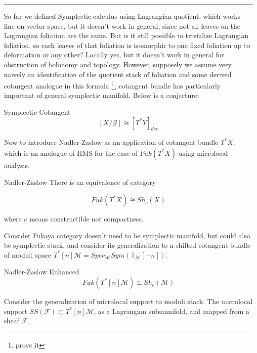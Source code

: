 \documentclass{article}
\begin{document}
\vspace{0.5cm}
\noindent\rule{\textwidth}{0.4pt}
\vspace{0.5cm}



\noindent
So far we defined Symplectic calculus using Lagrangian quotient, which works fine on vector space,
but it doesn't work in general, since not all leaves on the Lagrangian foliation are the same.
But is it still possible to trivialize Lagrangian foliation, 
so each leaves of that foliation is isomorphic to one fixed foliation up to deformation or any other?
Locally yes, but it doesn't work in general for obstruction of holonomy and topology.
However, supposely we assume very na\"{\i}vely 
an identification of the quotient stack of foliation and some derived cotangent analogue in this formula \footnote{prove it},
cotangent bundle has particularly important of general symplectic manifold. Below is a conjecture: \\

\begin{conjecture}{Symplectic Cotangent}{}
\[
[X/\mathcal{G}] \cong [T^* Y]_{der}
\]
\end{conjecture}


\noindent
Now to introduce Nadler-Zaslow as an application of cotangent bundle $T^*X$,
which is an analogue of HMS for the case of $Fuk(T^*X)$ using microlocal analysis. \\

\begin{proposition}{Nadler-Zaslow}{}
There is an equivalence of category

\[Fuk(T^*X) \cong Sh_c(X)\]

where $c$ means constructible not compactness.
\end{proposition}

\noindent
Consider Fukaya category doesn't need to be symplectic manifold, but could also be symplectic stack,
and consider its generalization to n-shifted cotangent bundle of moduli space 
$T^*[n]\mathcal{M} = Spec_{\mathcal{M}} Sym(\mathbb{T}_{\mathcal{M}}[-n])$. \\

\begin{conjecture}{Nadler-Zaslow Enhanced}{}
\[Fuk(T^*[n]\mathcal{M}) \cong Sh_c(\mathcal{M})\]
\end{conjecture}


\begin{remark}{}{}
Consider the generalization of microlocal support to moduli stack.
The microlocal support $SS(\mathcal{F}) \subset T^*[n]\mathcal{M}$, as a Lagrangian submanifold,
and mapped from a sheaf $\mathcal{F}$.
\end{remark}
\end{document}

